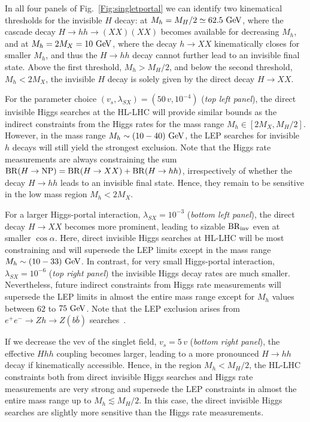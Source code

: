 \documentclass[../report.tex]{subfiles}
\begin{document}
In all four panels of Fig.~\ref{Fig:singletportal} we can identify two kinematical thresholds for the invisible $H$ decay: at $M_h = M_H/2 \simeq 62.5~\text{GeV}$, where the cascade decay $H\to hh\to (XX)(XX)$ becomes available for decreasing $M_h$, and at $M_h = 2 M_X = 10~\text{GeV}$, where the decay $h\to XX$ kinematically closes for smaller $M_h$, and thus the $H\to hh$ decay cannot further lead to an invisible final state. Above the first threshold, $M_h > M_H/2$, and below the second threshold, $M_h < 2M_X$, the invisible $H$ decay is solely given by {the direct decay} $H\to XX$. 

For the parameter choice $(v_s, \lambda_{SX}) = (50\,v, 10^{-4})$ (\emph{top left panel}), the direct invisible Higgs searches at the HL-LHC {will} provide similar bounds as the indirect constraints from the Higgs rates for the mass range $M_h \in [2 M_X, M_H/2]$. However, in the mass range $M_{h}\sim (10-40)~\text{GeV}$, the LEP searches for invisible $h$ decays will still yield the strongest exclusion. Note that the Higgs rate measurements are always constraining the sum $\mathrm{BR}(H\to\mathrm{NP}) = \mathrm{BR}(H\to XX) + \mathrm{BR}(H\to hh)$, irrespectively of whether the decay $H\to hh$ leads to an invisible final state. Hence, they remain to be sensitive in the low mass region $M_h < 2 M_X$.

For a larger Higgs-portal interaction, $\lambda_{SX} = 10^{-3}$ (\emph{bottom left panel}), the direct decay $H\to XX$ becomes more prominent, leading to sizable $\mathrm{BR}_\mathrm{inv}$ even at smaller $\cos\alpha$. Here, direct invisible Higgs searches at HL-LHC will be most constraining and will supersede the LEP limits except in the mass range $M_h\sim (10-33)~\text{GeV}$. {In contrast,} for very small Higgs-portal interaction, $\lambda_{SX} = 10^{-6}$ (\emph{top right panel}) {the invisible Higgs decay rates are much smaller. Nevertheless,} future indirect constraints from Higgs rate measurements will supersede the LEP limits {in almost the entire mass range except for $M_h$ values between $62$ to $75~\text{GeV}$.}
Note that the LEP exclusion arises from $e^+e^- \to Zh \to Z(b\bar{b})$ searches~\cite{Schael:2006cr}.

If we decrease the vev of the singlet field, $v_s = 5\,v$ (\emph{bottom right panel}), the effective $Hhh$ coupling becomes larger, leading to a more pronounced $H\to hh$ decay if kinematically accessible. Hence, in the region $M_{h} < M_H/2$, the HL-LHC constraints both from direct invisible Higgs searches and Higgs rate measurements are very strong and supersede the LEP constraints in almost the entire mass range up to $M_h \lesssim M_H/2$. {In this case, the direct invisible Higgs searches} are slightly more {sensitive} than the {Higgs rate measurements}.
\end{document}
